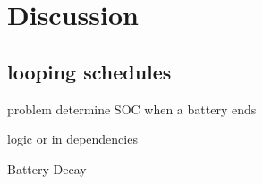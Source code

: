 \section{Discussion} \label{sec:discussion}

\subsection{looping schedules}
problem determine SOC when a battery ends 

logic or in dependencies

Battery Decay
